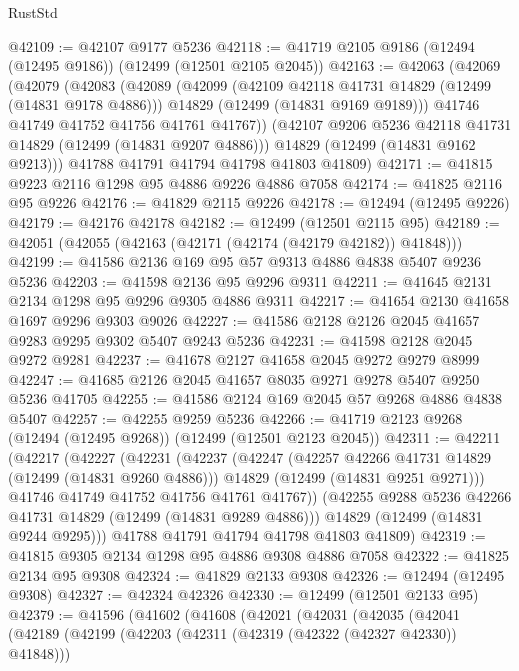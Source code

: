 \begin{lexlean}{RustStd}
\begin{coremodule}
@42109 := @42107 @9177 @5236
@42118 := @41719 @2105 @9186 (@12494 (@12495 @9186)) (@12499 (@12501 @2105 @2045))
@42163 := @42063
    (@42069
      (@42079
        (@42083
          (@42089
            (@42099
              (@42109 @42118 @41731 @14829 (@12499 (@14831 @9178 @4886)))
              @14829
              (@12499 (@14831 @9169 @9189)))
            @41746
            @41749
            @41752
            @41756
            @41761
            @41767))
        (@42107 @9206 @5236 @42118 @41731 @14829 (@12499 (@14831 @9207 @4886)))
        @14829
        (@12499 (@14831 @9162 @9213)))
      @41788
      @41791
      @41794
      @41798
      @41803
      @41809)
@42171 := @41815 @9223 @2116 @1298 @95 @4886 @9226 @4886 @7058
@42174 := @41825 @2116 @95 @9226
@42176 := @41829 @2115 @9226
@42178 := @12494 (@12495 @9226)
@42179 := @42176 @42178
@42182 := @12499 (@12501 @2115 @95)
@42189 := @42051 (@42055 (@42163 (@42171 (@42174 (@42179 @42182)) @41848)))
@42199 := @41586 @2136 @169 @95 @57 @9313 @4886 @4838 @5407 @9236 @5236
@42203 := @41598 @2136 @95 @9296 @9311
@42211 := @41645 @2131 @2134 @1298 @95 @9296 @9305 @4886 @9311
@42217 := @41654 @2130 @41658 @1697 @9296 @9303 @9026
@42227 := @41586 @2128 @2126 @2045 @41657 @9283 @9295 @9302 @5407 @9243 @5236
@42231 := @41598 @2128 @2045 @9272 @9281
@42237 := @41678 @2127 @41658 @2045 @9272 @9279 @8999
@42247 := @41685 @2126 @2045 @41657 @8035 @9271 @9278 @5407 @9250 @5236 @41705
@42255 := @41586 @2124 @169 @2045 @57 @9268 @4886 @4838 @5407
@42257 := @42255 @9259 @5236
@42266 := @41719 @2123 @9268 (@12494 (@12495 @9268)) (@12499 (@12501 @2123 @2045))
@42311 := @42211
    (@42217
      (@42227
        (@42231
          (@42237
            (@42247
              (@42257 @42266 @41731 @14829 (@12499 (@14831 @9260 @4886)))
              @14829
              (@12499 (@14831 @9251 @9271)))
            @41746
            @41749
            @41752
            @41756
            @41761
            @41767))
        (@42255 @9288 @5236 @42266 @41731 @14829 (@12499 (@14831 @9289 @4886)))
        @14829
        (@12499 (@14831 @9244 @9295)))
      @41788
      @41791
      @41794
      @41798
      @41803
      @41809)
@42319 := @41815 @9305 @2134 @1298 @95 @4886 @9308 @4886 @7058
@42322 := @41825 @2134 @95 @9308
@42324 := @41829 @2133 @9308
@42326 := @12494 (@12495 @9308)
@42327 := @42324 @42326
@42330 := @12499 (@12501 @2133 @95)
@42379 := @41596
    (@41602
      (@41608
        (@42021
          (@42031
            (@42035
              (@42041
                (@42189
                  (@42199
                    (@42203 (@42311 (@42319 (@42322 (@42327 @42330)) @41848)))

\end{coremodule}
\end{lexlean}
